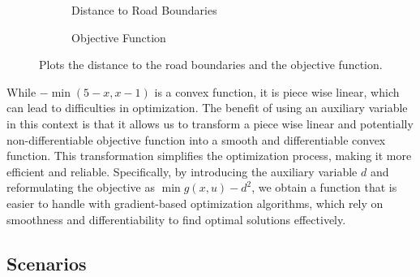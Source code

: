 \begin{figure}[H]
	\centering
	\begin{subfigure}{0.48\textwidth}
		\centering
		\caption{Distance to Road Boundaries}
		\label{fig:road_boundaries}
	\end{subfigure}
	\hfill
	\begin{subfigure}{0.48\textwidth}
		\centering
		\caption{Objective Function}
		\label{fig:objective_functions}
	\end{subfigure}
	\caption{Plots the distance to the road boundaries and the objective function.}
	\label{fig:auxiliary_variables}
\end{figure}

While \(-\min(5 - x, x - 1)\) is a convex function, it is piece wise linear, which can lead to difficulties in optimization.
The benefit of using an auxiliary variable in this context is that it allows us to transform a piece wise linear and potentially non-differentiable
objective function into a smooth and differentiable convex function.
This transformation simplifies the optimization process, making it more efficient and reliable.
Specifically, by introducing the auxiliary variable \( d \) and reformulating the objective as \(\min g(x, u) - d^2\), we obtain a function that is
easier to handle with gradient-based optimization algorithms, which rely on smoothness and differentiability to find optimal solutions effectively.

\subsection{Scenarios} \label{subsec:scenarios}

